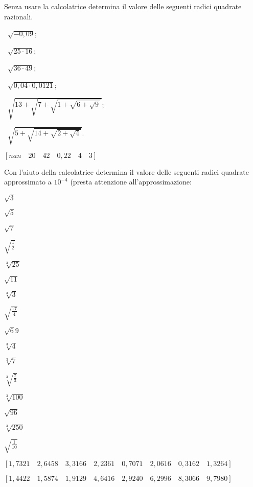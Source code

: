 \begin{esercizio}
 \label{ese:2.02}
Senza usare la calcolatrice determina il valore delle seguenti radici 
quadrate razionali.
\begin{multicols}{2}
 \begin{enumeratea}
 \item~$\sqrt{-0,09}$;
 \item~$\sqrt{25\cdot 16}$;
 \item~$\sqrt{36\cdot 49}$;
 \item~$\sqrt{0,04\cdot 0,0121}$;
 \item~$\sqrt{13+\sqrt{7+\sqrt{1+\sqrt{6+\sqrt 9}}}}$;
 \item~$\sqrt{5+\sqrt{14+\sqrt{2+\sqrt 4}}}$.
 \end{enumeratea}
 \end{multicols}
\begin{flushright}
\vspace*{-8pt}
$[nan \quad 20 \quad 42 \quad 0,22 \quad 4 \quad 3]$
\end{flushright}
\end{esercizio}

\begin{esercizio}
 \label{ese:2.03}
Con l'aiuto della calcolatrice determina il valore delle seguenti radici 
quadrate approssimato a $10^{-4}$ (presta attenzione all'approssimazione:
 \begin{multicols}{4}
 \begin{enumeratea}
 \item $\sqrt 3$
 \item $\sqrt 5$
 \item $\sqrt 7$
 \item $\sqrt{\frac 1 2}$
 \item $\sqrt[3]{25}$
 \item $\sqrt{11}$
 \item $\sqrt[3]3$
 \item $\sqrt{\frac{17} 4}$
 \item $\sqrt 69$
 \item $\sqrt[3]4$
 \item $\sqrt[3]7$
 \item $\sqrt[3]{\frac{7}{3}}$
 \item $\sqrt[3]{100}$
 \item $\sqrt{96}$
 \item $\sqrt[3]{250}$
 \item $\sqrt{\frac{1}{10}}$
 \end{enumeratea}
 \end{multicols}
\begin{flushright}
\vspace*{-8pt}
$[1,7321 \quad 2,6458 \quad 3,3166 \quad 2,2361 \quad 0,7071 \quad 
  2,0616 \quad 0,3162 \quad 1,3264]$
  
$[1,4422 \quad 1,5874 \quad 1,9129 \quad
  4,6416 \quad 2,9240 \quad 6,2996 \quad 8,3066 \quad 9,7980]$
\end{flushright}
\end{esercizio}

